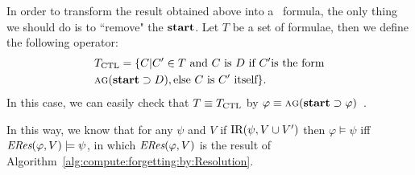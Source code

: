 \documentclass[letterpaper]{article} %
\begin{document}
 

In order to transform the result obtained above into a \CTL\ formula, the only thing we should do is to ``remove" the $\textbf{start}$. Let $T$ be a set of formulae, then we define the following operator:
\begin{align*}
&T_{\CTL} = \{C|C'\in T\ \mbox{and}\ C\ \mbox{is}\ D \ \mbox{if}\ C' \mbox{is the form}\\
& \ALL\GLOBAL(\start\supset D), \mbox{else}\ C\ \mbox{is}\  C' \ \mbox{itself}\}.
\end{align*}
In this case, we can easily check that $T \equiv T_{\textrm{CTL}}$ by $\varphi \equiv \textsc{a} \textsc{g} (\textbf{start} \supset \varphi)$~\cite{bolotov2000clausal}.

In this way, we know that for any $\psi$ and $V$ if $\textrm{IR}(\psi, V \cup V')$ then $\varphi \models \psi$ iff $\emph{ERes}(\varphi,V) \models \psi$, in which $\emph{ERes}(\varphi,V)$ is the result of Algorithm~\ref{alg:compute:forgetting:by:Resolution}. 

\end{document}
